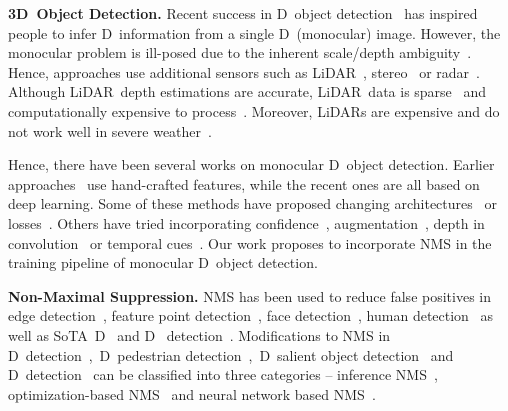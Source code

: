 \documentclass[final]{cvpr}
\newcommand{\twoD}{D}
\newcommand{\threeD}{D}
\newcommand{\lidar}{LiDAR}
\newcommand{\sota}{SoTA}
\begin{document}
\noindent\textbf{3D~Object Detection.}
        Recent success in \twoD~object detection~\cite{girshick2014rich,girshick2015fast, ren2015faster,redmon2016you,lin2018focal}
        has inspired people to infer \threeD~information from a single \twoD~(monocular) image. 
        However, the monocular problem is ill-posed due to the inherent scale/depth ambiguity~\cite{tang2020center3d}. 
        Hence, approaches use additional sensors such as \lidar~\cite{shi2019pointrcnn,wu2020motionnet,huang2020epnet}, stereo~\cite{li2019stereo,wang2019pseudo} or radar~\cite{vasile2005pose,moosmann2009segmentation}. 
        Although \lidar~depth estimations are accurate, \lidar~data is sparse~\cite{hu2020you} and computationally expensive to process~\cite{tang2020center3d}. 
        Moreover, \lidar s are expensive and do not work well in severe weather~\cite{tang2020center3d}. 
    
        Hence, there have been several works on monocular \threeD~object detection. Earlier approaches~\cite{payet2011contours, fidler20123d, pepik2015multi, chen2016monocular} use hand-crafted features, while the recent ones are all based on deep learning.
        Some of these methods have proposed changing
        architectures~\cite{liu2019deep,li2020rtm3d,tang2020center3d} or losses~\cite{brazil2019m3d,chen2020monopair}. Others have tried incorporating confidence~\cite{liu2019deep,simonelli2020disentangling,brazil2020kinematic,shi2020distance}, augmentation~\cite{simonelli2020towards},  
        depth in convolution~\cite{brazil2019m3d, ding2020learning} or temporal cues~\cite{brazil2020kinematic}. 
        Our work proposes to incorporate NMS in the training pipeline of monocular \threeD~object detection.
    
\noindent\textbf{Non-Maximal Suppression.}
        NMS has been used to reduce false positives in edge detection~\cite{rosenfeld1971edge}, feature point detection~\cite{harris1988combined, lowe2004distinctive, mikolajczyk2004scale}, face detection~\cite{viola2001rapid}, human detection~\cite{dalal2005histograms, brazil2017illuminating, brazil2019pedestrian} as well as \sota~\twoD~\cite{girshick2015fast, ren2015faster,redmon2016you,lin2018focal} and \threeD~ detection~\cite{bao2019monofenet, chen2017multi, simonelli2020disentangling, brazil2020kinematic, shi2020distance, tang2020center3d}.
        Modifications to NMS in \twoD~detection~\cite{desai2011discriminative, bodla2017soft,hosang2016convnet, prokudin2017learning, hosang2017learning},~\twoD~pedestrian detection~\cite{rujikietgumjorn2013optimized, lee2016individualness, liu2019adaptive},~\twoD~salient object detection~\cite{zhang2016unconstrained} and \threeD~detection~\cite{shi2020distance} can be classified into three categories -- inference NMS~\cite{bodla2017soft,shi2020distance}, optimization-based NMS~\cite{desai2011discriminative,wan2015end, rujikietgumjorn2013optimized, lee2016individualness, zhang2016unconstrained, azadi2017learning} and neural network based NMS~\cite{henderson2016end, hosang2016convnet, prokudin2017learning, hosang2017learning, liu2019adaptive}. 
        
\end{document}
